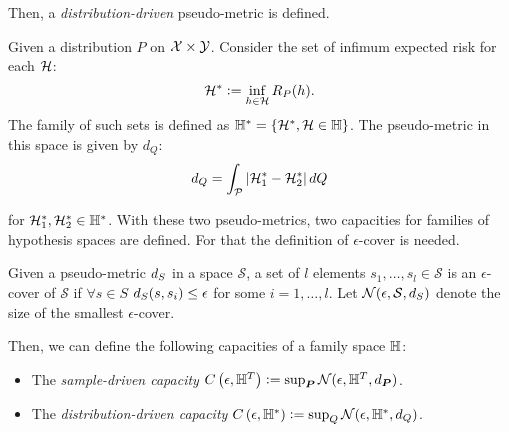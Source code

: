 Then, a \emph{distribution-driven} pseudo-metric is defined. 
\begin{definition}
    \label{def:dist_pseudometric}
    Given a distribution $P$ on $\mathcal{X} \times \mathcal{Y}$. Consider the set of infimum expected risk for each $\mathcal{H}$:
\begin{equation}
    \nonumber
    \mathcal{H}^* \vcentcolon= \inf_{h \in \mathcal{H}} R_P(h).
\end{equation}
The family of such sets is defined as 
$\mathbb{H}^{*} = \left\{\mathcal{H}^*, \mathcal{H} \in \mathbb{H}\right\}$.
The pseudo-metric in this space is given by $d_Q$:
\begin{equation}
    \nonumber
    d_{Q} = \int_{\mathcal{P}} \left|\mathcal{H}_1^* - \mathcal{H}_2^*\right| dQ
\end{equation}
\end{definition}
for $\mathcal{H}_1^*, \mathcal{H}_2^* \in \mathbb{H}^*$.
With these two pseudo-metrics, two capacities for families of hypothesis spaces are defined. For that the definition of $\epsilon$-cover is needed. 
\begin{definition}
    \label{def:epsilon_cover}
    Given a pseudo-metric $d_{S}$ in a space $\mathcal{S}$, 
a set of $l$ elements $s_1, \ldots, s_l \in \mathcal{S}$ is an $\epsilon$-cover of $\mathcal{S}$ if 
$ \forall s \in S$ $d_{S}(s, s_i) \leq \epsilon $
for some $i=1, \ldots, l$.  Let $\mathcal{N}(\epsilon, \mathcal{S}, d_{S})$ denote the size of the smallest $\epsilon$-cover.
\end{definition}
%
Then, we can define the following capacities of a family space $\mathbb{H}$:
\begin{itemize}
    \item The \emph{sample-driven capacity} $C\left(\epsilon, \mathbb{H}^{T}\right) \vcentcolon= \sup_{\bm{P}} \mathcal{N}(\epsilon, \mathbb{H}^T, d_{\bm{P}})$.
    \item The \emph{distribution-driven capacity} $C\left(\epsilon, \mathbb{H}^{*}\right) \vcentcolon= \sup_Q \mathcal{N}(\epsilon, \mathbb{H}^{*}, d_{Q})$.
\end{itemize}


